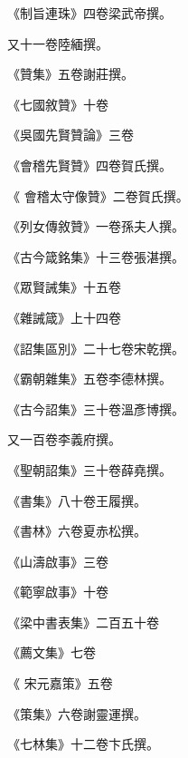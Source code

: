 \begin{pinyinscope}
 《制旨連珠》四卷梁武帝撰。



 又十一卷陸緬撰。



 《贊集》五卷謝莊撰。



 《七國敘贊》十卷



 《吳國先賢贊論》三卷



 《會稽先賢贊》四卷賀氏撰。



 《
 會稽太守像贊》二卷賀氏撰。



 《列女傳敘贊》一卷孫夫人撰。



 《古今箴銘集》十三卷張湛撰。



 《眾賢誡集》十五卷



 《雜誡箴》上十四卷



 《詔集區別》二十七卷宋乾撰。



 《霸朝雜集》五卷李德林撰。



 《古今詔集》三十卷溫彥博撰。



 又一百卷李義府撰。



 《聖朝詔集》三十卷薛堯撰。



 《書集》八十卷王履撰。



 《書林》六卷夏赤松撰。



 《山濤啟事》三卷



 《範寧啟事》十卷



 《梁中書表集》二百五十卷



 《薦文集》七卷



 《
 宋元嘉策》五卷



 《策集》六卷謝靈運撰。



 《七林集》十二卷卞氏撰。




\end{pinyinscope}
